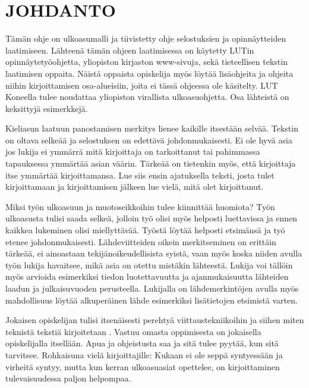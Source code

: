 \documentclass{LUT_pohja}[2016/03/09 LUT Dippa Pohja]
\begin{document}
\newpage
\section{JOHDANTO}
Tämän ohje on ulkoasumalli ja tiivistetty ohje selostuksien ja opinnäytteiden laatimiseen. 
Lähteenä tämän ohjeen laatimisessa on käytetty LUTin opinnäytetyöohjetta, yliopiston 
kirjaston www-sivuja, sekä tieteellisen tekstin laatimisen oppaita. Näistä oppaista 
opiskelija myös löytää lisäohjeita ja ohjeita niihin kirjoittamisen osa-alueisiin, joita ei tässä ohjeessa ole käsitelty. LUT Koneella tulee noudattaa yliopiston virallista ulkoasuohjetta. Osa lähteistä on keksittyjä esimerkkejä. \par

Kieliasun laatuun panostamisen merkitys lienee kaikille itsestään selvää. Tekstin on oltava selkeää ja selostuksen on edettävä johdonmukaisesti. Ei ole hyvä asia jos lukija ei ymmärrä mitä kirjoittaja on tarkoittanut tai pahimmassa tapauksessa ymmärtää asian väärin. Tärkeää on tietenkin myös, että kirjoittaja itse ymmärtää kirjoittamansa. Lue siis ensin ajatuksella teksti, josta tulet kirjoittamaan ja kirjoittamisen jälkeen lue vielä, mitä olet kirjoittanut.\par 

Miksi työn ulkoasuun ja muotoseikkoihin tulee kiinnittää huomiota? Työn ulkoasusta tulisi saada selkeä, jolloin työ olisi myös helposti luettavissa ja ennen kaikkea lukeminen olisi miellyttävää.  Työstä löytää helposti etsimänsä  ja työ  etenee  johdonmukaisesti. Lähdeviitteiden  oikein  merkitseminen  on  erittäin  tärkeää,  ei  ainoastaan tekijänoikeudellisista syistä, vaan myös koska niiden avulla työn lukija havaitsee, mikä asia on otettu mistäkin lähteestä. Lukija voi tällöin myös arvioida esimerkiksi tiedon luotettavuutta ja ajanmukaisuutta lähteiden laadun ja julkaisuvuoden perusteella. Lukijalla on lähdemerkintöjen avulla myös mahdollisuus löytää alkuperäinen lähde esimerkiksi lisätietojen etsimistä varten.\par

Jokaisen opiskelijan tulisi itsenäisesti perehtyä viittaustekniikoihin ja siihen miten teknistä tekstiä kirjoitetaan \citep{Pakkanen05}. Vastuu omasta oppimisesta on jokaisella opiskelijalla itsellään. Apua ja ohjeistusta saa ja sitä tulee pyytää, kun sitä tarvitsee. Rohkaisuna vielä kirjoittajille: Kukaan ei ole seppä syntyessään ja virheitä syntyy, mutta kun kerran ulkoasuasiat opettelee, on kirjoittaminen tulevaisuudessa paljon helpompaa. \citep{Viittaaminen07}
\end{document}
